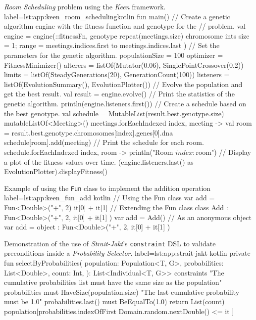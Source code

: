 \begin{code}{
    \textit{Room Scheduling} problem using the \textit{Keen} framework.
  }{label=lst:app:keen_room_scheduling}{kotlin}
    fun main() {
        // Create a genetic algorithm engine with the fitness function and genotype for the 
        // problem.
        val engine = engine(::fitnessFn, genotype {
            repeat(meetings.size) {
                chromosome {
                    ints { size = 1; range = meetings.indices.first to meetings.indices.last }
                }
            }
        }) {
            // Set the parameters for the genetic algorithm.
            populationSize = 100
            optimizer = FitnessMinimizer()
            alterers = listOf(Mutator(0.06), SinglePointCrossover(0.2))
            limits = listOf(SteadyGenerations(20), GenerationCount(100))
            listeners = listOf(EvolutionSummary(), EvolutionPlotter())
        }
        // Evolve the population and get the best result.
        val result = engine.evolve()
        // Print the statistics of the genetic algorithm.
        println(engine.listeners.first())
        // Create a schedule based on the best genotype.
        val schedule = MutableList(result.best.genotype.size) { mutableListOf<Meeting>() }
        meetings.forEachIndexed { index, meeting ->
            val room = result.best.genotype.chromosomes[index].genes[0].dna
            schedule[room].add(meeting)
        }
        // Print the schedule for each room.
        schedule.forEachIndexed { index, room ->
            println("Room $index: $room")
        }
        // Display a plot of the fitness values over time.
        (engine.listeners.last() as EvolutionPlotter).displayFitness()
    }
  \end{code}

  \begin{code}{
    Example of using the \texttt{Fun} class to implement the addition 
    operation
  }{
    label=lst:app:keen_fun_add
  }{kotlin}
    // Using the Fun class
    var add = Fun<Double>("+", 2) { it[0] + it[1] }
    // Extending the Fun class
    class Add : Fun<Double>("+", 2, { it[0] + it[1] })
    var add = Add()
    // As an anonymous object
    var add = object : Fun<Double>("+", 2, { it[0] + it[1] }) {}
  \end{code}

  \begin{code}{
    Demonstration of the use of \textit{Strait-Jakt}'s \texttt{constraint} DSL
    to validate preconditions inside a \textit{Probability Selector}.
  }{
    label=lst:app:strait-jakt
  }{kotlin}
    private fun selectByProbabilities(
      population: Population<T, G>,
      probabilities: List<Double>,
      count: Int,
    ): List<Individual<T, G>> {
      constraints {
        "The cumulative probabilities list must have the same size as the population" {
          probabilities must HaveSize(population.size)
        }
        "The last cumulative probability must be 1.0" {
          probabilities.last() must BeEqualTo(1.0)
        }
      }
      return List(count) {
        population[probabilities.indexOfFirst { Domain.random.nextDouble() <= it }]
      }
    }
  \end{code}
